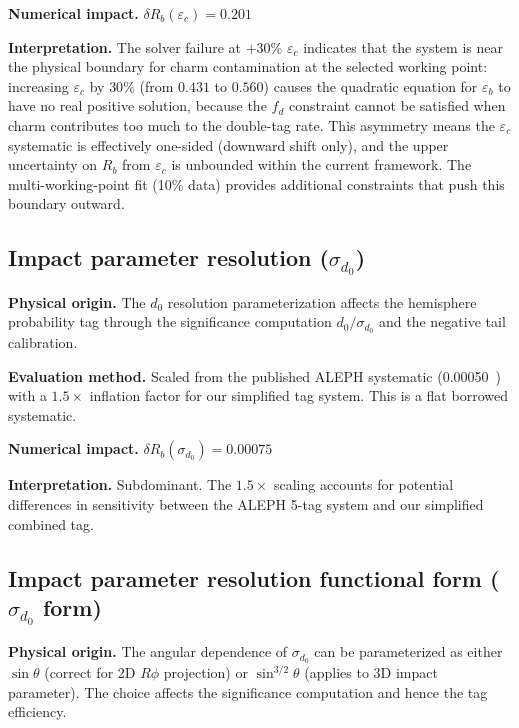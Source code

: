 \documentclass[11pt,a4paper]{article}
\begin{document}
\textbf{Numerical impact.}
$\delta R_b(\varepsilon_c) = 0.201$

\textbf{Interpretation.} The solver failure at $+30\%$ $\varepsilon_c$ indicates
that the system is near the physical boundary for charm contamination at the
selected working point: increasing $\varepsilon_c$ by $30\%$ (from $0.431$ to
$0.560$) causes the quadratic equation for $\varepsilon_b$ to have no real
positive solution, because the $f_d$ constraint cannot be satisfied when charm
contributes too much to the double-tag rate. This asymmetry means the
$\varepsilon_c$ systematic is effectively one-sided (downward shift only), and
the upper uncertainty on $R_b$ from $\varepsilon_c$ is unbounded within the
current framework. The multi-working-point fit (10\% data) provides additional
constraints that push this boundary outward.

\subsection{Impact parameter resolution ($\sigma_{d_0}$)}
\label{sec:syst_sigma_d0}

\textbf{Physical origin.} The $d_0$ resolution parameterization affects the hemisphere
probability tag through the significance computation $d_0/\sigma_{d_0}$ and the negative
tail calibration.

\textbf{Evaluation method.} Scaled from the published ALEPH systematic
(0.00050~\cite{ALEPH:Rb:1996}) with a $1.5\times$ inflation factor for our simplified
tag system. This is a flat borrowed systematic.

\textbf{Numerical impact.}
$\delta R_b(\sigma_{d_0}) = 0.00075$

\textbf{Interpretation.} Subdominant. The $1.5\times$ scaling accounts for potential
differences in sensitivity between the ALEPH 5-tag system and our simplified combined tag.

\subsection{Impact parameter resolution functional form ($\sigma_{d_0}$ form)}
\label{sec:syst_sigma_d0_form}

\textbf{Physical origin.} The angular dependence of $\sigma_{d_0}$ can be parameterized
as either $\sin\theta$ (correct for 2D $R\phi$ projection) or $\sin^{3/2}\theta$
(applies to 3D impact parameter). The choice affects the significance computation
and hence the tag efficiency.
\end{document}
